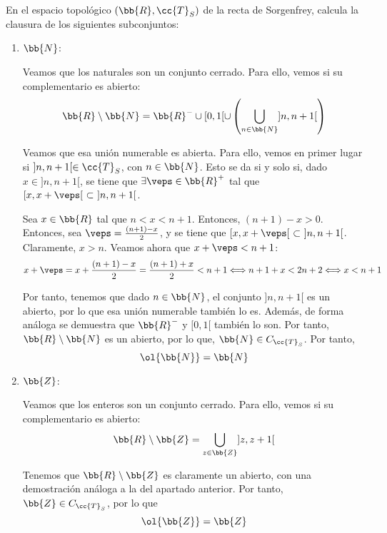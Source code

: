 \begin{ejercicio}
    En el espacio topológico $(\bb{R}, \cc{T}_S)$ de la recta de Sorgenfrey, calcula la clausura de los siguientes subconjuntos:
    \begin{enumerate}
        \item $\bb{N}$:

        Veamos que los naturales son un conjunto cerrado. Para ello, vemos si su complementario es abierto:
        \begin{equation*}
            \bb{R}\setminus \bb{N} = \bb{R}^-\cup [0,1[\cup \left(\bigcup_{n\in \bb{N}}]n,n+1[\right)
        \end{equation*}

        Veamos que esa unión numerable es abierta. Para ello, vemos en primer lugar si $]n,n+1[\in \cc{T}_S$, con $n\in \bb{N}$. Esto se da si y solo si, dado $x\in ]n,n+1[$, se tiene que $\exists \veps\in \bb{R}^+$ tal que $[x,x+\veps[~\subset~ ]n,n+1[$.

        Sea $x\in \bb{R}$ tal que $n<x<n+1$. Entonces, $(n+1)-x>0$. Entonces, sea $\veps=\frac{(n+1)-x}{2}$, y se tiene que $[x,x+\veps[~\subset~]n,n+1[$. Claramente, $x>n$. Veamos ahora que $x+\veps<n+1$:
        \begin{equation*}
            x+\veps=x+\frac{(n+1)-x}{2}
            = \frac{(n+1)+x}{2}
            < n+1 \Longleftrightarrow n+1+x<2n+2 \Longleftrightarrow x<n+1
        \end{equation*}

        Por tanto, tenemos que dado $n\in \bb{N}$, el conjunto $]n,n+1[$ es un abierto, por lo que esa unión numerable también lo es. Además, de forma análoga se demuestra que $\bb{R}^-$ y $[0,1[$ también lo son. Por tanto, $\bb{R}\setminus \bb{N}$ es un abierto, por lo que, $\bb{N}\in C_{\cc{T}_S}$. Por tanto,
        $$\ol{\bb{N}}=\bb{N}$$
        
        \item $\bb{Z}$:
        
        Veamos que los enteros son un conjunto cerrado. Para ello, vemos si su complementario es abierto:
        \begin{equation*}
            \bb{R}\setminus \bb{Z} = \bigcup_{z\in \bb{Z}}]z,z+1[
        \end{equation*}
        
        Tenemos que $\bb{R}\setminus \bb{Z}$ es claramente un abierto, con una demostración análoga a la del apartado anterior. Por tanto, $\bb{Z}\in C_{\cc{T}_S}$, por lo que
        $$\ol{\bb{Z}}=\bb{Z}$$
        

\end{enumerate}
\end{ejercicio}
